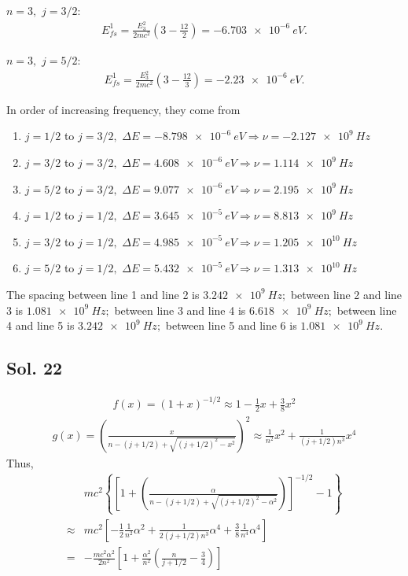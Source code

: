 $n=3,$ $j=3/2:$
\begin{align*}
    E^1_{fs} = \frac{E_3^2}{2mc^2}(3-\frac{12}{2})= -\qty{6.703e-6}{eV}.
\end{align*}

$n=3,$ $j=5/2:$
\begin{align*}
    E^1_{fs} = \frac{E_3^2}{2mc^2}(3-\frac{12}{3})= -\qty{2.23e-6}{eV}.
\end{align*}




In order of increasing frequency, they come from 
\begin{enumerate}
    \item $j=1/2$ to $j=3/2,$
$\Delta E=-\qty{8.798e-6}{eV}\Rightarrow \nu =-\qty{2.127e9}{Hz}$
    \item $j=3/2$ to $j=3/2,$
$\Delta E=\qty{4.608e-6}{eV}
\Rightarrow \nu =\qty{1.114e9}{Hz}$
    \item $j=5/2$ to $j=3/2,$
$\Delta E=\qty{9.077e-6}{eV}
\Rightarrow \nu =\qty{2.195e9}{Hz}$
    \item $j=1/2$ to $j=1/2,$
$\Delta E=\qty{3.645e-5}{eV}\Rightarrow \nu =\qty{8.813e9}{Hz}$

    \item
$j=3/2$ to $j=1/2,$
$\Delta E=\qty{4.985e-5}{eV}
\Rightarrow \nu =\qty{1.205e10}{Hz}$


    \item 
$j=5/2$ to $j=1/2,$
$\Delta E=\qty{5.432e-5}{eV}
\Rightarrow \nu =\qty{1.313e10}{Hz}$


\end{enumerate}
The spacing between line 1 and line 2 is 
$\qty{3.242e9}{Hz};$ 
between line 2 and line 3 is 
$\qty{1.081e9}{Hz};$ 
between line 3 and line 4 is 
$\qty{6.618e9}{Hz};$
between line 4 and line 5 is 
$\qty{3.242e9}{Hz};$
between line 5 and line 6 is 
$\qty{1.081e9}{Hz}.$

\subsection*{Sol. 22}

\begin{align*}
    f(x) = (1+x)^{-1/2}\approx 1-\frac{1}{2}x + \frac{3}{8}x^2
\end{align*}
\begin{align*}
    g(x) = \left(\frac{x}{n-(j+1/2)+\sqrt{(j+1/2)^2-x^2}}\right)^2
    \approx\frac{1}{n^2} x^2
    +\frac{1}{(j+1/2)n^3}x^4
\end{align*}
Thus, 
\begin{align*}
    &mc^2\left\{\left[1 + \left(
    \frac{\alpha}{n-(j+1/2)+\sqrt{(j+1/2)^2-\alpha^2}}
    \right)\right]^{-1/2} - 1\right\}\\
    \approx & 
    mc^2\left[
    -\frac{1}{2}\frac{1}{n^2} \alpha^2
    +\frac{1}{2(j+1/2)n^3}\alpha^4
    +\frac{3}{8}\frac{1}{n^4}\alpha^4
    \right]
    \\
    =&-\frac{mc^2\alpha^2}{2n^2}
    \left[
    1 + \frac{\alpha^2}{n^2}
    \left(\frac{n}{j+1/2}-\frac{3}{4}\right)
    \right]
\end{align*}

